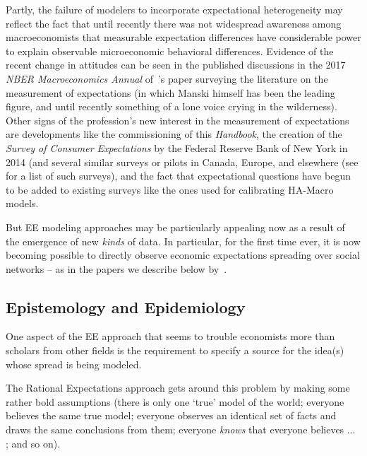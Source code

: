 Partly, the failure of modelers to incorporate expectational heterogeneity may reflect the fact that until recently there was not widespread awareness among macroeconomists that measurable expectation differences have considerable power to explain observable microeconomic behavioral differences.  Evidence of the recent change in attitudes can be seen in the published discussions in the 2017 \textit{NBER Macroeconomics Annual} of~\cite{manski2017survey}'s paper surveying the literature on the measurement of expectations (in which Manski himself has been the leading figure, and until recently something of a lone voice crying in the wilderness).  %
Other signs of the profession's new interest in the measurement of expectations are developments like the commissioning of this \emph{Handbook}, the creation of the \emph{Survey of Consumer Expectations} by the Federal Reserve Bank of New York in 2014 (and several similar surveys or pilots in Canada, Europe, and elsewhere (see {\bdkhouseholdFull} for a list of such surveys), and the fact that expectational questions have begun to be added to existing surveys like the ones used for calibrating HA-Macro models.  %

But EE modeling approaches may be particularly appealing now as a result of the emergence of new \emph{kinds} of data.  In particular, for the first time ever, it is now becoming possible to directly observe economic expectations spreading over social networks -- as in the papers we describe below by~\cite{bailey2018economic, bailey2019house}.

\subsection{Epistemology and Epidemiology}

One aspect of the EE approach that seems to trouble economists more than scholars from other fields is the requirement to specify a source for the idea(s) whose spread is being modeled.

The Rational Expectations approach gets around this problem by making some rather bold assumptions (there is only one `true' model of the world; everyone believes the same true model; everyone observes an identical set of facts and draws the same conclusions from them; everyone \emph{knows} that everyone believes ... ; and so on).  %


